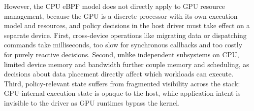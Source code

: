 
However, the CPU eBPF model does not directly apply to GPU resource management, because the GPU is a discrete processor with its own execution model and resources, and policy decisions in the host driver must take effect on a separate device. First, cross-device operations like migrating data or dispatching commands take milliseconds, too slow for synchronous callbacks and too costly for purely reactive decisions. Second, unlike independent subsystems on CPU, limited device memory and bandwidth further couple memory and scheduling, as decisions about data placement directly affect which workloads can execute. Third, policy-relevant state suffers from fragmented visibility across the stack: GPU-internal execution state is opaque to the host, while application intent is invisible to the driver as GPU runtimes bypass the kernel.


